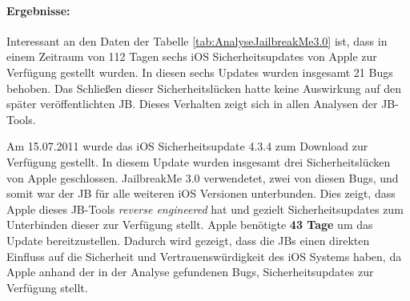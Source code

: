 \paragraph{Ergebnisse:} Interessant an den Daten der Tabelle \ref{tab:AnalyseJailbreakMe3.0} ist, dass in einem Zeitraum von 112 Tagen sechs iOS Sicherheitsupdates von Apple zur Verfügung gestellt wurden. In diesen sechs Updates wurden insgesamt 21 Bugs behoben. Das Schließen dieser Sicherheitslücken hatte keine Auswirkung auf den später veröffentlichten JB. Dieses Verhalten zeigt sich in allen Analysen der JB-Tools. \par  
Am 15.07.2011 wurde das iOS Sicherheitsupdate 4.3.4 zum Download zur Verfügung gestellt. In diesem Update wurden insgesamt drei Sicherheitslücken von Apple geschlossen. JailbreakMe 3.0 verwendetet, zwei von diesen Bugs, und somit war der JB für alle weiteren iOS Versionen unterbunden. Dies zeigt, dass Apple dieses JB-Tools \textit{\glqq reverse engineered\grqq{}} hat und gezielt Sicherheitsupdates zum Unterbinden dieser zur Verfügung stellt. Apple benötigte \textbf{43 Tage} um das Update bereitzustellen. Dadurch wird gezeigt, dass die JBs einen direkten Einfluss auf die Sicherheit und Vertrauenswürdigkeit des iOS Systems haben, da Apple anhand der in der Analyse gefundenen Bugs, Sicherheitsupdates zur Verfügung stellt. \par 

